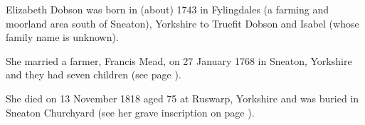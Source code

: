 
Elizabeth Dobson was born in (about) 1743 in Fylingdales (a farming and moorland area south of Sneaton), Yorkshire to Truefit Dobson and Isabel (whose family name is unknown). 

She married a farmer, Francis Mead, on 27 January 1768 in	Sneaton, Yorkshire and they had seven children (see page \pageref{Francis_Mead}).

She died on 13 November 1818 aged 75 at Ruswarp, Yorkshire and was buried in Sneaton Churchyard (see her grave inscription on page \pageref{Francis_Mead}).\cite{FMeadDeath}

